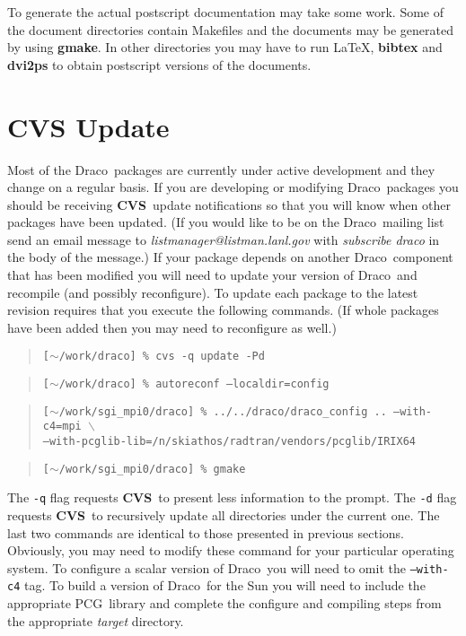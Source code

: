 \documentclass[11pt]{nmemo}
\newcommand{\comp}[1]{\normalfont\normalsize\texttt{#1}}
\newcommand{\draco}{{\normalfont\sffamily Draco}}
\newcommand{\pcg}{{\normalfont\sffamily PCG}}
\newcommand{\cvs}{{\normalfont\bfseries CVS}}
\begin{document}
To generate the actual postscript documentation may take some work.
Some of the document directories contain Makefiles and the documents
may be generated by using \textbf{gmake}.  In other directories you
may have to run \LaTeX, \textbf{bibtex} and \textbf{dvi2ps} to obtain
postscript versions of the documents.

\section{CVS Update}

Most of the \draco\ packages are currently under active development
and they change on a regular basis.  If you are developing or
modifying \draco\ packages you should be receiving \cvs\ update
notifications so that you will know when other packages have been
updated.  (If you would like to be on the \draco\ mailing list send an
email message to \emph{listmanager@listman.lanl.gov} with
\emph{subscribe draco} in the body of the message.)  If your package
depends on another \draco\ component that has been modified you will
need to update your version of \draco\ and recompile (and possibly
reconfigure).  To update each package to the latest revision requires
that you execute the following commands.  (If whole packages have been
added then you may need to reconfigure as well.)

\begin{verse}
\texttt{[$\sim$/work/draco] \% cvs -q update -Pd}
\end{verse}

\begin{verse}
\texttt{[$\sim$/work/draco] \% autoreconf --localdir=config }
\end{verse}

\begin{verse}
\texttt{[$\sim$/work/sgi\_mpi0/draco] \% ../../draco/draco\_config
.. --with-c4=mpi $\backslash$ \\
\hspace{0.5in}--with-pcglib-lib=/n/skiathos/radtran/vendors/pcglib/IRIX64}
\end{verse}

\begin{verse}
\texttt{[$\sim$/work/sgi\_mpi0/draco] \% gmake}
\end{verse}

The \comp{-q} flag requests \cvs\ to present less information to the
prompt.  The \comp{-d} flag requests \cvs\ to recursively update all
directories under the current one.  The last two commands are
identical to those presented in previous sections.  Obviously, you may
need to modify these command for your particular operating system.  To
configure a scalar version of \draco\ you will need to omit the
\comp{--with-c4} tag.  To build a version of \draco\ for the Sun you
will need to include the appropriate \pcg\ library and complete the
configure and compiling steps from the appropriate \emph{target}
directory.
\end{document}
